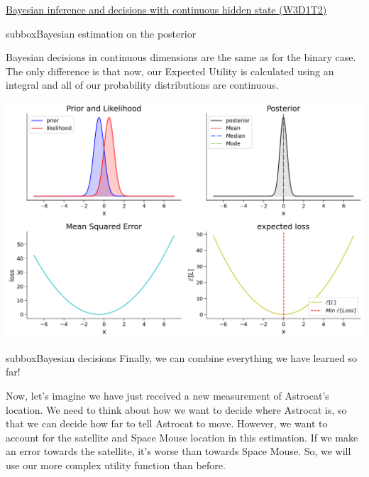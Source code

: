 \begin{textbox}{\href{https://compneuro.neuromatch.io/tutorials/W3D1_BayesianDecisions/student/W3D1_Tutorial2.html}{Bayesian inference and decisions with continuous hidden state (W3D1T2)} }
\begin{subbox}{subbox}{Bayesian estimation on the posterior}
\scriptsize


Bayesian decisions in continuous dimensions are the same as for the binary case. The only difference is that now, our Expected Utility is calculated using an integral and all of our probability distributions are continuous.
\begin{center}
    
\includegraphics[scale=0.23]{Figures/BD/BD_Figure12.png}
\end{center}
\end{subbox}
\begin{subbox}{subbox}{Bayesian decisions}
\scriptsize
Finally, we can combine everything we have learned so far! 

Now, let's imagine we have just received a new measurement of Astrocat's location. We need to think about how we want to decide where Astrocat is, so that we can decide how far to tell Astrocat to move. However, we want to account for the satellite and Space Mouse location in this estimation. If we make an error towards the satellite, it's worse than towards Space Mouse. So, we will use our more complex utility function than before. 

\begin{center}
    

\end{center}
\end{subbox}
\end{textbox}
